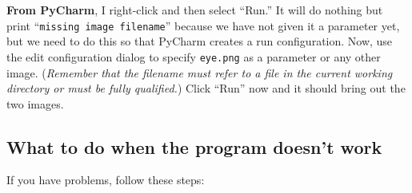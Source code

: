 \documentclass[titlepage]{tufte-book}
\newcounter{problem}
\begin{document}
{\bf From PyCharm}, I right-click and then select ``Run.'' It will do nothing but print ``{\tt missing image filename}'' because we have not given it a parameter yet, but we need to do this so that PyCharm creates a run configuration. Now, use the edit configuration dialog to specify {\tt eye.png} as a parameter or any other image. ({\em Remember that the filename must refer to a file in the current working directory or must be fully qualified.}) Click ``Run'' now and it should bring out the two images.


\subsection{What to do when the program doesn't work}

If you have problems, follow these steps:
\end{document}
